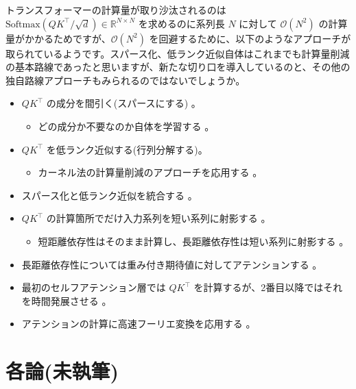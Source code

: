 \documentclass[b5paper,xelatex,ja=standard,10pt]{bxjsarticle}
\begin{document}
トランスフォーマーの計算量が取り沙汰されるのは $\mathrm{Softmax} \left( Q K ^\top / \sqrt{d} \right) \in \mathbb{R}^{N \times N}$ を求めるのに系列長 $N$ に対して $\mathcal{O}(N^2)$ の計算量がかかるためですが、$\mathcal{O}(N^2)$ を回避するために、以下のようなアプローチが取られているようです。スパース化、低ランク近似自体はこれまでも計算量削減の基本路線であったと思いますが、新たな切り口を導入しているのと、その他の独自路線アプローチもみられるのではないでしょうか。
\begin{itemize}
  \item $Q K ^\top$ の成分を間引く(スパースにする) 。
  \begin{itemize}
    \item どの成分か不要なのか自体を学習する \cite{11_Jaszczur2021}。
  \end{itemize}
  \item $Q K ^\top$ を低ランク近似する(行列分解する)。
  \begin{itemize}
    \item カーネル法の計算量削減のアプローチを応用する \cite{03_Chen2021}。
  \end{itemize}
  \item スパース化と低ランク近似を統合する \cite{19_Chen2021}。
  \vspace{5pt}
  \item $Q K ^\top$ の計算箇所でだけ入力系列を短い系列に射影する \cite{04_Ma2021}。
  \begin{itemize}
    \item 短距離依存性はそのまま計算し、長距離依存性は短い系列に射影する \cite{20_Zhu2021}。
  \end{itemize}
  \vspace{5pt}
  \item 長距離依存性については重み付き期待値に対してアテンションする \cite{24_Ren2021}。
  \vspace{5pt}
  \item 最初のセルフアテンション層では $Q K ^\top$ を計算するが、2番目以降ではそれを時間発展させる \cite{07_Dutta2021}。
  \vspace{5pt}
  \item アテンションの計算に高速フーリエ変換を応用する \cite{25_Luo2021}。
\end{itemize}

\section*{各論(未執筆)}
\end{document}
